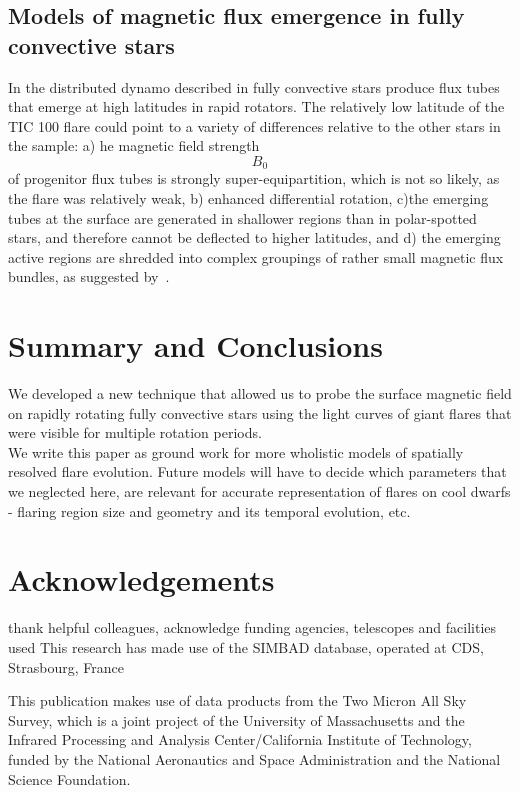\documentclass[fleqn,usenatbib,letters]{mnras}%
\begin{document}
\subsection{Models of magnetic flux emergence in fully convective stars}
In the distributed dynamo described in \citet{weber2016} fully convective stars produce flux tubes that emerge at high latitudes in rapid rotators. The relatively low latitude of the TIC 100 flare could point to a variety of differences relative to the other stars in the sample: a) he magnetic field strength $$B_0$$ of progenitor flux tubes is strongly super-equipartition, which is not so likely, as the flare was relatively weak, b) enhanced differential rotation, c)the emerging tubes at the surface are generated in shallower regions than in polar-spotted stars, and therefore cannot be deflected to higher latitudes, and d) the emerging active regions are shredded into complex groupings of rather small magnetic flux bundles, as suggested by~\citet{yadav2015}.

\section{Summary and Conclusions}
\label{sec:summary}
We developed a new technique that allowed us to probe the surface magnetic field on rapidly rotating fully convective stars using the light curves of giant flares that were visible for multiple rotation periods.
\\
We write this paper as ground work for more wholistic models of spatially resolved flare evolution. Future models will have to decide which parameters that we neglected here, are relevant for accurate representation of flares on cool dwarfs - flaring region size and geometry and its temporal evolution, etc.
\section*{Acknowledgements}

thank helpful colleagues, acknowledge funding agencies, telescopes and facilities used
This research has made use of the SIMBAD database,
operated at CDS, Strasbourg, France~\citep{wenger2000}

This publication makes use of data products from the Two Micron All Sky Survey, which is a joint project of the University of Massachusetts and the Infrared Processing and Analysis Center/California Institute of Technology, funded by the National Aeronautics and Space Administration and the National Science Foundation.
\end{document}
